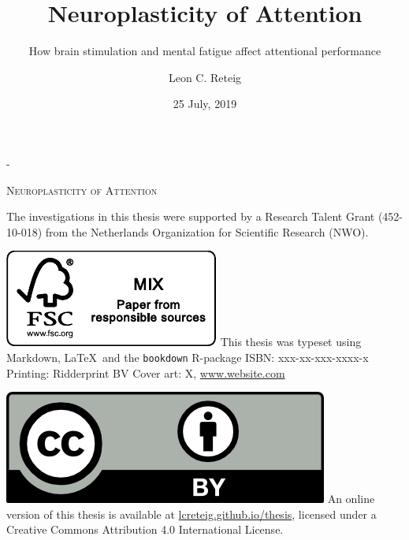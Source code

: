 \documentclass[11pt,]{memoir}
\title{Neuroplasticity of Attention}
\subtitle{How brain stimulation and mental fatigue affect attentional performance}
\author{Leon C. Reteig}
\date{25 July, 2019}
\begin{document}
\maketitle

\setlength{\abstitleskip}{-\absparindent}

\frontmatter
\pagestyle{empty} 

\def\drop{.1\textheight}
\newlength{\mylength}

\vspace*{\drop}
\calccentering{\mylength}
\begin{adjustwidth*}{\mylength}{-\mylength} %
\begin{center}
\Huge \textsc{Neuroplasticity of Attention} %
\end{center}
\end{adjustwidth*}

\clearpage
\vspace*{\fill}
\begingroup %
\small
\setlength{\parskip}{\baselineskip} %
\setlength\parindent{0pt} %
The investigations in this thesis were supported by 
a Research Talent Grant (452-10-018)  %
from 
the Netherlands Organization for Scientific Research (NWO). %

\includegraphics{_bookdown_files/FSC.pdf} \newline
This thesis was typeset using Markdown, \LaTeX\ and the \verb+bookdown+ R-package \newline
ISBN: xxx-xx-xxx-xxxx-x \newline %
Printing: Ridderprint BV \newline %
Cover art: X, \url{www.website.com} %

\includegraphics{_bookdown_files/CC-BY.png} \newline
An online version of this thesis is available at 
\url{lcreteig.github.io/thesis},  %
licensed under a 
Creative Commons Attribution 4.0 International License. %
\endgroup
\end{document}
